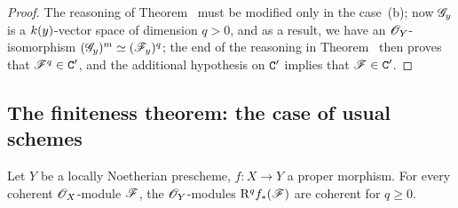 \begin{proof}
\label{proof-3.3.1.3}
The reasoning of Theorem~ must be modified only in the case~(b); now $\mathscr{G}_y$ is a $k(y)$-vector space of dimension $q>0$, and as a result, we have an $\mathscr{O}_Y$-isomorphism $(\mathscr{G}_y)^m\simeq(\mathscr{F}_y)^q$; the end of the reasoning in Theorem~ then proves that $\mathscr{F}^q\in\mathtt{C}'$, and the additional hypothesis on $\mathtt{C}'$ implies that $\mathscr{F}\in\mathtt{C}'$.
\end{proof}

\subsection{The finiteness theorem: the case of usual schemes}
\label{subsection:3.3.2}

\begin{theorem}[3.2.1]
\label{3.3.2.1}
Let $Y$ be a locally Noetherian prescheme, $f:X\to Y$ a proper morphism.
For every coherent $\mathscr{O}_X$-module $\mathscr{F}$, the $\mathscr{O}_Y$-modules $\mathrm{R}^q f_*(\mathscr{F})$ are coherent for $q\geq 0$.
\end{theorem}

